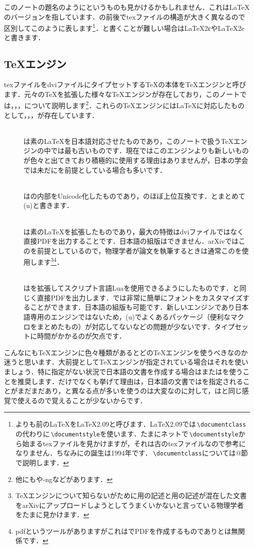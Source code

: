 このノートの題名のように\LaTeXe というものも見かけるかもしれません．これは\LaTeX のバージョンを指しています．\LaTeXe の前後でtexファイルの構造が大きく異なるので区別してこのように表します\footnote{\LaTeXe よりも前の\LaTeX を\LaTeX 2.09と呼びます．\LaTeX 2.09では\,\texttt{\backslash documentclass}の代わりに\,\texttt{\backslash documentstyle}を使います．たまにネットで\,\texttt{\backslash documentstyle}から始まるtexファイルを見かけますが，それは古のtexファイルなので参考になりません．ちなみに\LaTeXe の誕生は1994年です．\,\texttt{\backslash documentclass}については@節で説明します．}．\LaTeXe と書くことが難しい場合はLaTeX2εやLaTeX2eと書きます．

\subsection{\TeX エンジン}
texファイルをdviファイルにタイプセットする\TeX の本体を\TeX エンジンと呼びます．元々の\TeX を拡張した様々な\TeX エンジンが存在しており，このノートでは\pTeX ，\upTeX ，\pdfTeX ，\LuaTeX について説明します\footnote{他にも\XeTeX や\pTeX-ngなどがあります．}．これらの\TeX エンジンには\LaTeX に対応したものとして\pLaTeX ，\upLaTeX ，\pdfLaTeX ，\LuaLaTeX が存在しています．
\begin{description}
	\item[\pLaTeX] \mbox{}\\
		\pLaTeX は素の\LaTeX を日本語対応させたものであり，このノートで扱う\TeX エンジンの中では最も古いものです．現在ではこのエンジンよりも新しいものが色々と出てきており積極的に使用する理由はありませんが，日本の学会では未だに\pLaTeX を前提としている場合も多いです．
	\item[\upLaTeX] \mbox{}\\
		\upLaTeX は\pLaTeX の内部をUnicode化したものであり，\pLaTeX のほぼ上位互換です．\pLaTeX とまとめて(u)\pLaTeX と書きます．
	\item[\pdfLaTeX] \mbox{}\\
		\pdfLaTeX は素の\LaTeX を拡張したものであり，最大の特徴はdviファイルではなく直接PDFを出力することです．日本語の組版はできません．arXivではこの\pdfLaTeX を前提としているので，物理学者が論文を執筆するときは通常この\pdfLaTeX を使用します\footnote{\TeX エンジンについて知らないがために\pdfLaTeX 用の記述と\pLaTeX 用の記述が混在した文書をarXivにアップロードしようとしてうまくいかないと言っている物理学者をたまに見かけます．}\footnote{pdf\pLaTeX というツールがありますがこれは\pLaTeX でPDFを作成するものであり\pdfLaTeX とは無関係です．}．
	\item[\LuaLaTeX] \mbox{}\\
		\LuaLaTeX は\pdfLaTeX を拡張してスクリプト言語Luaを使用できるようにしたものです．\pdfLaTeX と同じく直接PDFを出力します．\LuaLaTeX では非常に簡単にフォントをカスタマイズすることができます．日本語の組版も可能です．新しいエンジンであり日本語専用のエンジンではないため，(u)\pLaTeX でよくあるパッケージ（便利なマクロをまとめたもの）が対応してないなどの問題が少ないです．タイプセットに時間がかかるのが欠点です．
\end{description}

こんなにも\TeX エンジンに色々種類があるとどの\TeX エンジンを使うべきなのか迷うと思います．大前提として\TeX エンジンが指定されている場合はそれを使いましょう．特に指定がない状況で日本語の文書を作成する場合は\upLaTeX または\LuaLaTeX を使うことを推奨します．\LuaLaTeX だけでなく\upLaTeX も挙げて理由は，日本語の文書では\pLaTeX を指定されることがまだまだあり，\pLaTeX と異なる点が多い\LuaLaTeX を使うのは大変なのに対して，\upLaTeX は\pLaTeX と同じ感覚で使えるので覚えることが少ないからです．